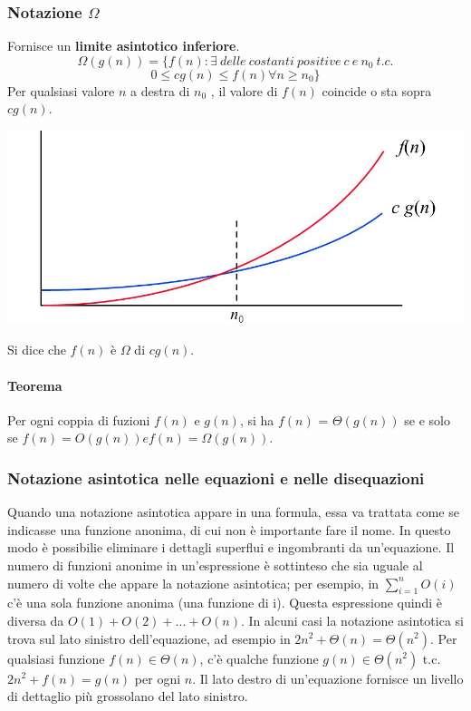 \documentclass[11pt,a4paper]{article}
\begin{document}
\subsubsection{Notazione $\Omega$}
Fornisce un \textbf{limite asintotico inferiore}.
\[\Omega (g(n)) = \{f(n): \exists \ delle\ costanti\ positive\ c\ e\ n_0\ t.c.\]
\[0 \leq cg(n) \leq f(n) \forall n \geq n_0 \} \]
Per qualsiasi valore $n$ a destra di $n_0$ , il valore di $f(n)$ coincide o sta sopra $cg(n)$.
\begin{center}
      \includegraphics[scale=0.4]{img/omega.png}
\end{center}
Si dice che $f(n)$ è $\Omega$ di $cg(n)$.

\paragraph{Teorema} Per ogni coppia di fuzioni $f(n)$ e $g(n)$, si ha $f(n)$ = $\Theta(g(n))$ se e solo se $f(n) = O(g(n)) e f(n) = \Omega (g(n))$.

\subsubsection{Notazione asintotica nelle equazioni e nelle disequazioni}
Quando una notazione asintotica appare in una formula, essa va trattata come se indicasse una funzione
anonima, di cui non è importante fare il nome. In questo modo è possibilie eliminare i dettagli superflui e ingombranti da un’equazione.
Il numero di funzioni anonime in un’espressione è sottinteso che sia uguale al numero di volte che appare la notazione asintotica; per esempio, in $\sum_{i=1}^n O(i)$ c’è una sola funzione anonima (una funzione di i). Questa espressione quindi è diversa da $O(1)+O(2)+...+O(n)$.
In alcuni casi la notazione asintotica si trova sul lato sinistro dell’equazione, ad esempio in $2n^2+\Theta(n) =\Theta(n^2)$.
Per qualsiasi funzione $f(n) \in \Theta(n)$, c’è qualche funzione $g(n) \in \Theta(n^2)$ t.c. $2n^2 +f(n) = g(n)$ per ogni $n$.
Il lato destro di un’equazione fornisce un livello di dettaglio più grossolano del lato sinistro.
\end{document}

